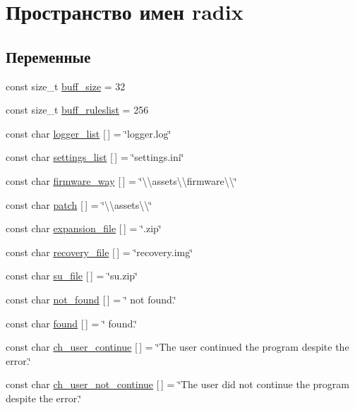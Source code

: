 \hypertarget{namespaceradix}{}\section{Пространство имен radix}
\label{namespaceradix}
\subsection*{Переменные}
\begin{DoxyCompactItemize}
\item 
const size\+\_\+t \hyperlink{namespaceradix_a82e81e89088b6430b7ec11a8a0329e9c}{buff\+\_\+size} = 32
\item 
const size\+\_\+t \hyperlink{namespaceradix_a8f000aabf647d34fd877c33958bad711}{buff\+\_\+ruleslist} = 256
\item 
const char \hyperlink{namespaceradix_a11c5bfe5c65a0f88a2a950111c6ffc09}{logger\+\_\+list} \mbox{[}$\,$\mbox{]} = \char`\"{}logger.\+log\char`\"{}
\item 
const char \hyperlink{namespaceradix_a43bff57dbd1b7dcebee0228ccbab7f17}{settings\+\_\+list} \mbox{[}$\,$\mbox{]} = \char`\"{}settings.\+ini\char`\"{}
\item 
const char \hyperlink{namespaceradix_a123392a7ece6e11efaf3ad3df291ff3d}{firmware\+\_\+way} \mbox{[}$\,$\mbox{]} = \char`\"{}\textbackslash{}\textbackslash{}assets\textbackslash{}\textbackslash{}firmware\textbackslash{}\textbackslash{}\char`\"{}
\item 
const char \hyperlink{namespaceradix_aa90f63f1d0143b58469670ccbb86cfc4}{patch} \mbox{[}$\,$\mbox{]} = \char`\"{}\textbackslash{}\textbackslash{}assets\textbackslash{}\textbackslash{}\char`\"{}
\item 
const char \hyperlink{namespaceradix_a01a09f0b88f6fd375ea20667bd318035}{expansion\+\_\+file} \mbox{[}$\,$\mbox{]} = \char`\"{}.zip\char`\"{}
\item 
const char \hyperlink{namespaceradix_a91c21d6be385236a564ef5bf1f3f3602}{recovery\+\_\+file} \mbox{[}$\,$\mbox{]} = \char`\"{}recovery.\+img\char`\"{}
\item 
const char \hyperlink{namespaceradix_abcd4cb3ab01a6a642ba224e2d9b1eda5}{su\+\_\+file} \mbox{[}$\,$\mbox{]} = \char`\"{}su.\+zip\char`\"{}
\item 
const char \hyperlink{namespaceradix_a9f0187ab8d7f9931ed08159a233408c0}{not\+\_\+found} \mbox{[}$\,$\mbox{]} = \char`\"{} not found.\char`\"{}
\item 
const char \hyperlink{namespaceradix_a27726ea7eb8e2bea153425bce9328be5}{found} \mbox{[}$\,$\mbox{]} = \char`\"{} found.\char`\"{}
\item 
const char \hyperlink{namespaceradix_ad5e76eca849713be360ed8478545d801}{ch\+\_\+user\+\_\+continue} \mbox{[}$\,$\mbox{]} = \char`\"{}The user continued the program despite the error.\char`\"{}
\item 
const char \hyperlink{namespaceradix_afd1855af7805a1bb408ea9175a626ac7}{ch\+\_\+user\+\_\+not\+\_\+continue} \mbox{[}$\,$\mbox{]} = \char`\"{}The user did not continue the program despite the error.\char`\"{}
\end{DoxyCompactItemize}


